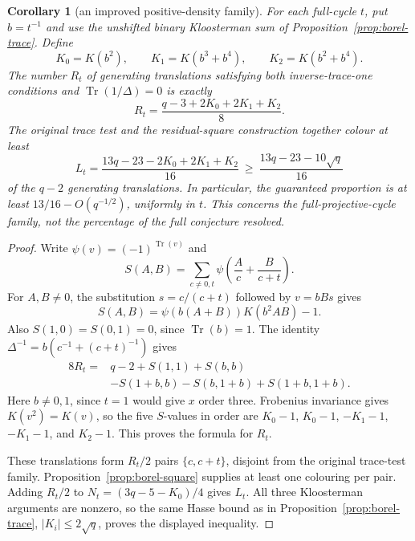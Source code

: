 \documentclass[11pt,a4paper]{article}
\newtheorem{corollary}[theorem]{Corollary}
\theoremstyle{definition}
\theoremstyle{remark}
\begin{document}
\begin{corollary}[an improved positive-density family]\label{cor:borel-thirteen-sixteenths}
For each full-cycle $t$, put $b=t^{-1}$ and use the unshifted binary Kloosterman sum of Proposition~\ref{prop:borel-trace}.  Define
\[
 K_0=K(b^2),\qquad K_1=K(b^3+b^4),\qquad K_2=K(b^2+b^4).
\]
The number $R_t$ of generating translations satisfying both inverse-trace-one conditions and $\operatorname{Tr}(1/\Delta)=0$ is exactly
\[
                    R_t=\frac{q-3+2K_0+2K_1+K_2}{8}.
\]
The original trace test and the residual-square construction together colour at least
\[
 L_t=\frac{13q-23-2K_0+2K_1+K_2}{16}
       \ \ge\ \frac{13q-23-10\sqrt q}{16}
\]
of the $q-2$ generating translations.  In particular, the guaranteed proportion is at least $13/16-O(q^{-1/2})$, uniformly in $t$.  This concerns the full-projective-cycle family, not the percentage of the full conjecture resolved.
\end{corollary}
\begin{proof}
Write $\psi(v)=(-1)^{\operatorname{Tr}(v)}$ and
\[
 S(A,B)=\sum_{c\ne0,t}\psi\left(\frac A c+\frac B{c+t}\right).
\]
For $A,B\ne0$, the substitution $s=c/(c+t)$ followed by $v=bBs$ gives
\[
                   S(A,B)=\psi(b(A+B))K(b^2AB)-1.
\]
Also $S(1,0)=S(0,1)=0$, since $\operatorname{Tr}(b)=1$.
The identity $\Delta^{-1}=b(c^{-1}+(c+t)^{-1})$ gives
\begin{align*}
8R_t={}&q-2+S(1,1)+S(b,b)\\
       &-S(1+b,b)-S(b,1+b)+S(1+b,1+b).
\end{align*}
Here $b\ne0,1$, since $t=1$ would give $x$ order three.  Frobenius invariance gives $K(v^2)=K(v)$, so the five $S$-values in order are $K_0-1$, $K_0-1$, $-K_1-1$, $-K_1-1$, and $K_2-1$.  This proves the formula for $R_t$.

These translations form $R_t/2$ pairs $\{c,c+t\}$, disjoint from the original trace-test family.  Proposition~\ref{prop:borel-square} supplies at least one colouring per pair.  Adding $R_t/2$ to $N_t=(3q-5-K_0)/4$ gives $L_t$.  All three Kloosterman arguments are nonzero, so the same Hasse bound as in Proposition~\ref{prop:borel-trace}, $|K_i|\le2\sqrt q$, proves the displayed inequality.
\end{proof}
\end{document}
